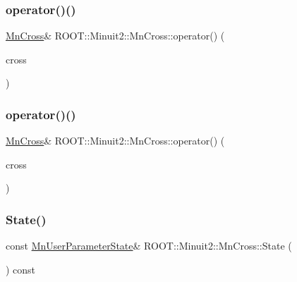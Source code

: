\mbox{\label{classROOT_1_1Minuit2_1_1MnCross_a12f4058d5a3b758cbaa68a0a9bc0cebb}} 
\subsubsection{\texorpdfstring{operator()()}{operator()()}\hspace{0.1cm}{\footnotesize\ttfamily [2/3]}}
{\footnotesize\ttfamily \mbox{\hyperlink{classROOT_1_1Minuit2_1_1MnCross}{Mn\+Cross}}\& R\+O\+O\+T\+::\+Minuit2\+::\+Mn\+Cross\+::operator() (\begin{DoxyParamCaption}\item[{const \mbox{\hyperlink{classROOT_1_1Minuit2_1_1MnCross}{Mn\+Cross}} \&}]{cross }\end{DoxyParamCaption})\hspace{0.3cm}{\ttfamily [inline]}}

\mbox{\label{classROOT_1_1Minuit2_1_1MnCross_a12f4058d5a3b758cbaa68a0a9bc0cebb}} 
\subsubsection{\texorpdfstring{operator()()}{operator()()}\hspace{0.1cm}{\footnotesize\ttfamily [3/3]}}
{\footnotesize\ttfamily \mbox{\hyperlink{classROOT_1_1Minuit2_1_1MnCross}{Mn\+Cross}}\& R\+O\+O\+T\+::\+Minuit2\+::\+Mn\+Cross\+::operator() (\begin{DoxyParamCaption}\item[{const \mbox{\hyperlink{classROOT_1_1Minuit2_1_1MnCross}{Mn\+Cross}} \&}]{cross }\end{DoxyParamCaption})\hspace{0.3cm}{\ttfamily [inline]}}

\mbox{\label{classROOT_1_1Minuit2_1_1MnCross_a97ba8e698ee948a842f0ebe198c0d528}} 
\subsubsection{\texorpdfstring{State()}{State()}\hspace{0.1cm}{\footnotesize\ttfamily [1/3]}}
{\footnotesize\ttfamily const \mbox{\hyperlink{classROOT_1_1Minuit2_1_1MnUserParameterState}{Mn\+User\+Parameter\+State}}\& R\+O\+O\+T\+::\+Minuit2\+::\+Mn\+Cross\+::\+State (\begin{DoxyParamCaption}{ }\end{DoxyParamCaption}) const\hspace{0.3cm}{\ttfamily [inline]}}

